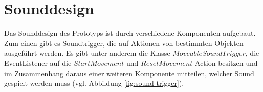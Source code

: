 


\section{Sounddesign}
Das Sounddesign des Prototyps ist durch verschiedene Komponenten aufgebaut. Zum einen gibt es Soundtrigger, die auf Aktionen von bestimmten Objekten ausgeführt werden. Es gibt unter anderem die Klasse $MoveableSoundTrigger$, die EventListener auf die $StartMovement$ und $ResetMovement$ Action besitzen und im Zusammenhang daraus einer weiteren Komponente mitteilen, welcher Sound gespielt werden muss (vgl. Abbildung \ref{fig:sound-trigger}).

